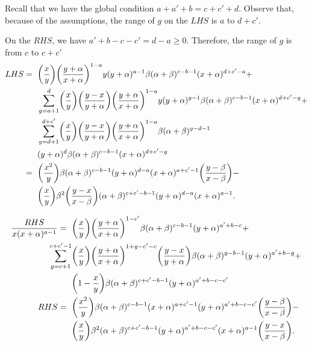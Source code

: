 \documentclass[ALCO, Unicode]{cedram}
\DeclarePairedDelimiter\autobracket{(}{)}
\newcommand{\br}[1]{\autobracket*{#1}}
\begin{document}

 Recall that we have the global condition $a+a'+b=c+c'+d$. Observe that, because of the assumptions, the range of $g$ on the $LHS$ is $a$ to $d+c'$.

On the $RHS$, we have $a'+b-c-c'=d-a\geq 0$. Therefore, the range of $g$ is from $c$ to $c+c'$
{\allowdisplaybreaks
\begin{align*}
LHS=\text{ }& \br{\dfrac{x}{y}}\br{\dfrac{y+\alpha}{x+\alpha}}^{1-a}y(y+\alpha)^{a-1}\beta (\alpha+\beta)^{c-b-1}(x+\alpha)^{d+c'-a}+\\
            & \sum^{d}_{g=a+1}\br{\dfrac{x}{y}}\br{\dfrac{y-x}{y+\alpha}}\br{\dfrac{y+\alpha}{x+\alpha}}^{1-a}y(y+\alpha)^{g-1}\beta (\alpha+\beta)^{c-b-1}(x+\alpha)^{d+c'-g}+\\
            &\sum^{d+c'}_{g=d+1} \br{\dfrac{x}{y}}\br{\dfrac{y-x}{y+\alpha}}\br{\dfrac{y+\alpha}{x+\alpha}}^{1-a} \beta (\alpha+\beta)^{g-d-1}\\
            &(y+\alpha)^{d}\beta (\alpha+\beta)^{c-b-1}(x+\alpha)^{d+c'-g}\\
             =\text{ }& \br{\dfrac{x^2}{y}}\beta (\alpha+\beta)^{c-b-1}(y+\alpha)^{d-a}(x+\alpha)^{a+c'-1}\br{\dfrac{y-\beta}{x-\beta}}-\\
            &\br{\dfrac{x}{y}}\beta^2 \br{\dfrac{y-x}{x-\beta}} (\alpha+\beta)^{c+c'-b-1}(y+\alpha)^{d-a}(x+\alpha)^{a-1}.
\end{align*}
}

{\allowdisplaybreaks
\begin{align*}
\dfrac{RHS}{x(x+\alpha)^{a-1}}
           =\text{ }& \br{\dfrac{x}{y}}\br{\dfrac{y+\alpha}{x+\alpha}}^{1-c'} \beta (\alpha+\beta)^{c-b-1} (y+\alpha)^{a'+b-c}+\\
           \sum^{c+c'-1}_{g=c+1}& \br{\dfrac{x}{y}}\br{\dfrac{y+\alpha}{x+\alpha}}^{1+g-c'-c} \br{\dfrac{y-x}{y+\alpha}}\beta (\alpha+\beta)^{g-b-1} (y+\alpha)^{a'+b-g}+\\
           &\br{1-\dfrac{x}{y}}\beta (\alpha+\beta)^{c+c'-b-1} (y+\alpha)^{a'+b-c-c'}\\
         RHS  =\text{ }&\br{\dfrac{x^2}{y}}\beta (\alpha+\beta)^{c-b-1}(x+\alpha)^{a+c'-1}(y+\alpha)^{a'+b-c-c'}\br{\dfrac{y-\beta}{x-\beta}}-\\
           &\br{\dfrac{x}{y}}\beta^2(\alpha+\beta)^{c+c'-b-1}(y+\alpha)^{a'+b-c-c'}(x+\alpha)^{a-1}\br{\dfrac{y-x}{x-\beta}}.
\end{align*}
}
           
\end{document}

